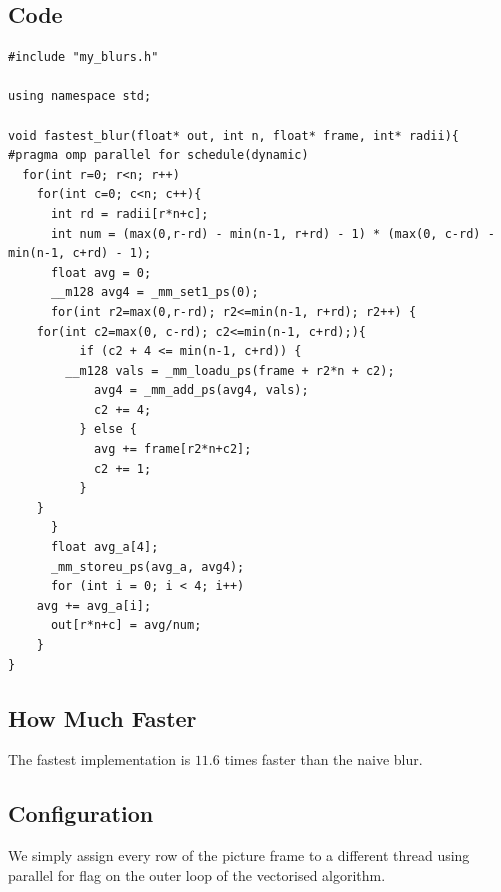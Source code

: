 \documentclass[11pt,letter]{article}
\begin{document}
\subsection{Code}
\begin{lstlisting}[label=some-code,caption=fastest\_blur.cpp]
#include "my_blurs.h"

using namespace std;

void fastest_blur(float* out, int n, float* frame, int* radii){
#pragma omp parallel for schedule(dynamic)
  for(int r=0; r<n; r++)
    for(int c=0; c<n; c++){
      int rd = radii[r*n+c];
      int num = (max(0,r-rd) - min(n-1, r+rd) - 1) * (max(0, c-rd) - min(n-1, c+rd) - 1);
      float avg = 0;
      __m128 avg4 = _mm_set1_ps(0);
      for(int r2=max(0,r-rd); r2<=min(n-1, r+rd); r2++) {
	for(int c2=max(0, c-rd); c2<=min(n-1, c+rd);){
          if (c2 + 4 <= min(n-1, c+rd)) {
	    __m128 vals = _mm_loadu_ps(frame + r2*n + c2);
            avg4 = _mm_add_ps(avg4, vals);
            c2 += 4;
          } else {
            avg += frame[r2*n+c2];
            c2 += 1;
          }
	}
      }
      float avg_a[4];
      _mm_storeu_ps(avg_a, avg4);
      for (int i = 0; i < 4; i++)
	avg += avg_a[i];
      out[r*n+c] = avg/num;
    }
}
\end{lstlisting}

\subsection{How Much Faster}
The fastest implementation is $11.6$ times faster than the naive blur. 
\subsection{Configuration}
We simply assign every row of the picture frame to a different thread using parallel for flag on the outer loop of the vectorised algorithm.

%


\end{document}
